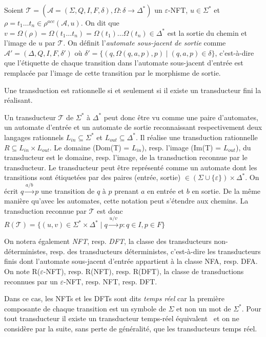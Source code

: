 	Soient $\mathscr{T} = (\mathscr{A} = (\Sigma,Q,I,F,\delta), \Omega:\delta \to \Delta^*)$ un $\varepsilon$-NFT, $u \in \Sigma^*$ et $\rho = t_1\ldots t_n \in \rho^{acc}(\mathscr{A}, u)$. On dit que $v = \Omega(\rho) = \Omega(t_1\dots t_n) = \Omega(t_1)\ldots \Omega(t_n) \in \Delta^*$ est la sortie du chemin et l'image de $u$ par $\mathscr{T}$.
	On définit l'\emph{automate sous-jacent de sortie} comme $\mathscr{A}' = (\Delta,Q,I,F,\delta')$ où $\delta' = \{(q, \Omega(q,a,p),p) \mid (q,a,p) \in \delta\}$, c'est-à-dire que l'étiquette de chaque transition dans l'automate sous-jacent d'entrée est remplacée par l'image de cette transition par le morphisme de sortie. \\
	
	\begin{theorem}
		Une transduction est rationnelle si et seulement si il existe un transducteur fini la réalisant.
	\end{theorem}
	
	Un transducteur $\mathscr{T}$ de $\Sigma^*$ à $\Delta^*$ peut donc être vu comme une paire d'automates, un automate d'entrée et un automate de sortie reconnaissant respectivement deux langages rationnels $L_{in} \subseteq \Sigma^*$ et $L_{out} \subseteq \Delta^*$. Il réalise une transduction rationnelle $R \subseteq L_{in} \times L_{out}$. Le domaine (Dom(T) = $L_{in}$), resp. l'image (Im(T) = $L_{out}$), du transducteur est le domaine, resp. l'image, de la transduction reconnue par le transducteur.
	Le transducteur peut être représenté comme un automate dont les transitions sont étiquetées par des paires (entrée, sortie) $\in (\Sigma \cup \{\varepsilon\}) \times \Delta^*$. On écrit $q\xrightarrow{a/b}p$ une transition de $q$ à $p$ prenant $a$ en entrée et $b$ en sortie. De la même manière qu'avec les automates, cette notation peut s'étendre aux chemins. La transduction reconnue par $\mathscr{T}$ est donc $R(\mathscr{T}) = \{(u,v) \in \Sigma^* \times \Delta^* \mid q\xrightarrow{u/v}p : q \in I, p \in F\}$
	
	On notera également \emph{NFT}, resp. \emph{DFT}, la classe des transducteurs non-déterministes, resp. des transducteurs déterministes, c'est-à-dire les transducteurs finis dont l'automate sous-jacent d'entrée appartient à la classe NFA, resp. DFA.
	On note R($\varepsilon$-NFT), resp. R(NFT), resp. R(DFT), la classe de transductions reconnues par un $\varepsilon$-NFT, resp. NFT, resp. DFT.
	
	Dans ce cas, les NFTs et les DFTs sont dits \emph{temps réel} car la première composante de chaque transition est un symbole de $\Sigma$ et non un mot de $\Sigma^*$. Pour tout transducteur il existe un transducteur temps-réel équivalent~\cite{Bea03} et on ne considère par la suite, sans perte de généralité, que les transducteurs temps réel. \\
	
